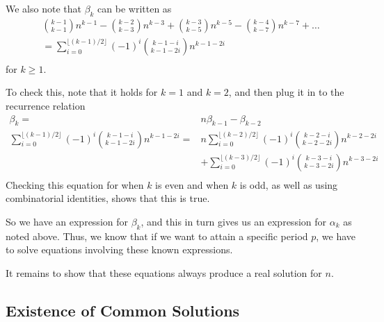 \documentclass[12pt]{article}
\begin{document}
We also note that $\beta_k$ can be written as 
\begin{align*}
\binom{k-1}{k-1} n^{k-1} - \binom{k-2}{k-3}n^{k-3} +\binom{k-3}{k-5}n^{k-5} -\binom{k-4}{k-7}n^{k-7} + \dots \\
=\sum_{i = 0}^{\lfloor (k-1)/2 \rfloor} (-1)^i\binom{k-1-i}{k-1-2i}n^{k-1-2i}\\
\end{align*}
for $k \geq 1$.

To check this, note that it holds for $k = 1$ and $k = 2$, and then plug it in to the recurrence relation
\begin{align*}
\beta_k =& n\beta_{k-1} - \beta_{k-2}\\
\sum_{i = 0}^{\lfloor (k-1)/2 \rfloor} (-1)^i\binom{k-1-i}{k-1-2i}n^{k-1-2i} = & n \sum_{i = 0}^{\lfloor (k-2)/2 \rfloor} (-1)^i\binom{k-2-i}{k-2-2i}n^{k-2-2i} \\
& +\sum_{i = 0}^{\lfloor (k-3)/2 \rfloor} (-1)^i\binom{k-3-i}{k-3-2i}n^{k-3-2i}\\
\end{align*}
Checking this equation for when $k$ is even and when $k$ is odd, as well as using combinatorial identities, shows that this is true.

So we have an expression for $\beta_k$, and this in turn gives us an expression for $\alpha_k$ as noted above. Thus, we know that if we want to attain a specific period $p$, we have to solve equations involving these known expressions.

It remains to show that these equations always produce a real solution for $n$.

\subsection{Existence of Common Solutions}
\end{document}
